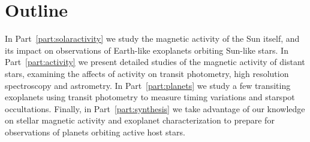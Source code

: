 \section{Outline}

In Part~\ref{part:solaractivity} we study the magnetic activity of the Sun itself, and its impact on observations of Earth-like exoplanets orbiting Sun-like stars. In Part~\ref{part:activity} we present detailed studies of the magnetic activity of distant stars, examining the affects of activity on transit photometry, high resolution spectroscopy and astrometry. In Part~\ref{part:planets} we study a few transiting exoplanets using transit photometry to measure timing variations and starspot occultations. Finally, in Part~\ref{part:synthesis} we take advantage of our knowledge on stellar magnetic activity and exoplanet characterization to prepare for observations of planets orbiting active host stars. 
